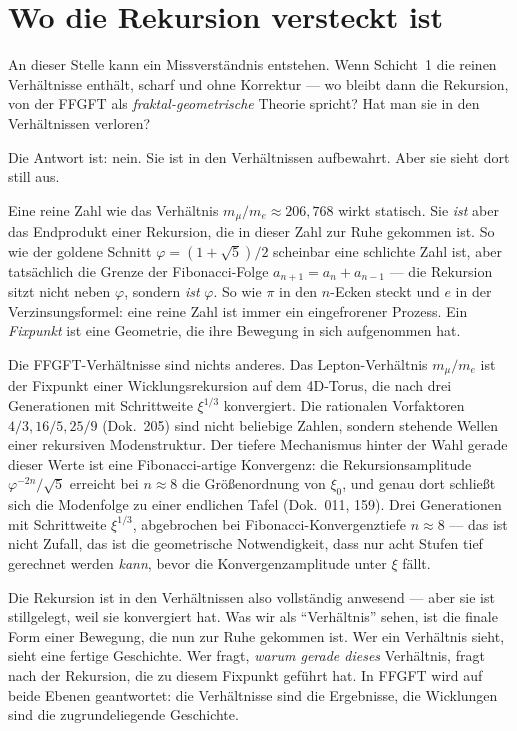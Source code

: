 \section{Wo die Rekursion versteckt ist}

An dieser Stelle kann ein Missverständnis entstehen. Wenn Schicht~1
die reinen Verhältnisse enthält, scharf und ohne Korrektur --- wo
bleibt dann die Rekursion, von der FFGFT als \emph{fraktal-geometrische}
Theorie spricht? Hat man sie in den Verhältnissen verloren?

Die Antwort ist: nein. Sie ist in den Verhältnissen aufbewahrt. Aber
sie sieht dort still aus.

Eine reine Zahl wie das Verhältnis $m_{\mu}/m_{e} \approx 206{,}768$
wirkt statisch. Sie \emph{ist} aber das Endprodukt einer Rekursion, die
in dieser Zahl zur Ruhe gekommen ist. So wie der goldene Schnitt
$\varphi = (1+\sqrt{5})/2$ scheinbar eine schlichte Zahl ist, aber
tatsächlich die Grenze der Fibonacci-Folge $a_{n+1} = a_{n} + a_{n-1}$
--- die Rekursion sitzt nicht neben $\varphi$, sondern \emph{ist}
$\varphi$. So wie $\pi$ in den $n$-Ecken steckt und $e$ in der
Verzinsungsformel: eine reine Zahl ist immer ein eingefrorener Prozess.
Ein \emph{Fixpunkt} ist eine Geometrie, die ihre Bewegung in sich
aufgenommen hat.

Die FFGFT-Verhältnisse sind nichts anderes. Das Lepton-Verhältnis
$m_{\mu}/m_{e}$ ist der Fixpunkt einer Wicklungsrekursion auf dem
4D-Torus, die nach drei Generationen mit Schrittweite $\xi^{1/3}$
konvergiert. Die rationalen Vorfaktoren $4/3, 16/5, 25/9$ (Dok.~205)
sind nicht beliebige Zahlen, sondern stehende Wellen einer rekursiven
Modenstruktur. Der tiefere Mechanismus hinter der Wahl gerade dieser
Werte ist eine Fibonacci-artige Konvergenz: die Rekursionsamplitude
$\varphi^{-2n}/\sqrt{5}$ erreicht bei $n \approx 8$ die Größenordnung
von $\xi_{0}$, und genau dort schließt sich die Modenfolge zu einer
endlichen Tafel (Dok.~011, 159). Drei Generationen mit Schrittweite
$\xi^{1/3}$, abgebrochen bei Fibonacci-Konvergenztiefe $n \approx 8$
--- das ist nicht Zufall, das ist die geometrische Notwendigkeit, dass
nur acht Stufen tief gerechnet werden \emph{kann}, bevor die
Konvergenzamplitude unter $\xi$ fällt.

Die Rekursion ist in den Verhältnissen also vollständig anwesend --- aber
sie ist stillgelegt, weil sie konvergiert hat. Was wir als ``Verhältnis''
sehen, ist die finale Form einer Bewegung, die nun zur Ruhe gekommen
ist. Wer ein Verhältnis sieht, sieht eine fertige Geschichte. Wer fragt,
\emph{warum gerade dieses} Verhältnis, fragt nach der Rekursion, die zu
diesem Fixpunkt geführt hat. In FFGFT wird auf beide Ebenen geantwortet:
die Verhältnisse sind die Ergebnisse, die Wicklungen sind die
zugrundeliegende Geschichte.

